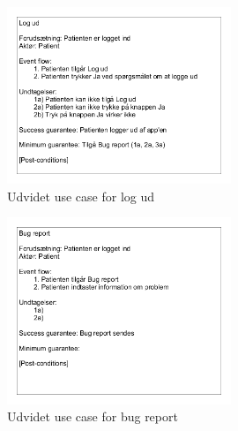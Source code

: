 \begin{figure}[H]
\centering
  \includegraphics[width=0.6\textwidth]{Billeder/logud.png}
   \caption{Udvidet use case for log ud} 
   \label{fig:hjerte}
\end{figure}


\begin{figure}[H]
\centering
  \includegraphics[width=0.6\textwidth]{Billeder/bugreport.png}
   \caption{Udvidet use case for bug report} 
   \label{fig:hjerte}
\end{figure}


